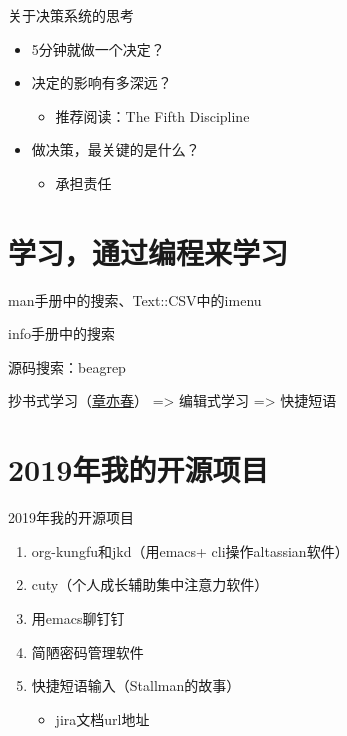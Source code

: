 \documentclass[presentation,dvipdfmx,CJKbookmarks]{beamer}
\begin{document}
\begin{CJK*}{UTF8}{simsun}
\begin{frame}[label={sec:orge6a6eec}]{关于决策系统的思考}
\begin{itemize}
\item 5\thinspace 分钟就做一个决定？
\item 决定的影响有多深远？
\begin{itemize}
\item 推荐阅读：The Fifth Discipline
\end{itemize}
\item 做决策，最关键的是什么？
\pause
\begin{itemize}
\item 承担责任
\end{itemize}
\end{itemize}
\end{frame}


\section{学习，通过编程来学习}
\label{sec:org8736c77}

\begin{frame}[label={sec:org81a9aa7}]{}
\begin{block}{man\thinspace 手册中的搜索、Text::CSV\thinspace 中的\thinspace imenu}
\end{block}
\begin{block}{info\thinspace 手册中的搜索}
\end{block}
\begin{block}{源码搜索：beagrep}
\end{block}
\begin{block}{抄书式学习（\href{https://www.zhihu.com/question/28951394}{章亦春}） => 编辑式学习 => 快捷短语}
\end{block}
\end{frame}

\section{2019\thinspace 年我的开源项目}
\label{sec:orgeb59848}
\begin{frame}[label={sec:org0f37ae5}]{2019\thinspace 年我的开源项目}
\begin{enumerate}
\item org-kungfu\thinspace 和\thinspace jkd（用\thinspace emacs\thinspace + cli\thinspace 操作\thinspace altassian\thinspace 软件）
\item cuty（个人成长辅助集中注意力软件）
\item 用\thinspace emacs\thinspace 聊钉钉
\item 简陋密码管理软件
\item 快捷短语输入（Stallman\thinspace 的故事）
\begin{itemize}
\item jira\thinspace 文档\thinspace url\thinspace 地址
\end{itemize}
\end{enumerate}
\end{frame}


\end{CJK*}
\end{document}
